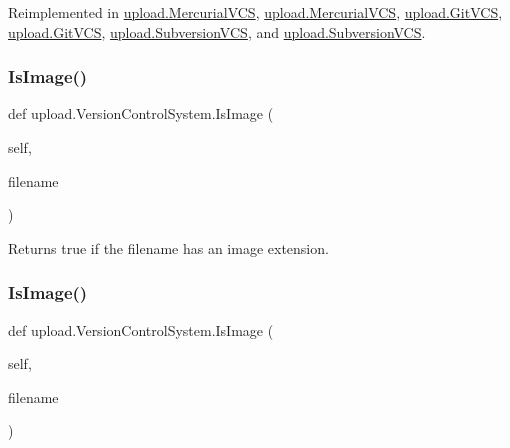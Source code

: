 Reimplemented in \mbox{\hyperlink{classupload_1_1_mercurial_v_c_s_a6190899fb86cd09ad84cc5d4b0ebd2f3}{upload.\+Mercurial\+V\+CS}}, \mbox{\hyperlink{classupload_1_1_mercurial_v_c_s_a6190899fb86cd09ad84cc5d4b0ebd2f3}{upload.\+Mercurial\+V\+CS}}, \mbox{\hyperlink{classupload_1_1_git_v_c_s_ae4e8c0e9fa01619c6a5c76d1ab84b995}{upload.\+Git\+V\+CS}}, \mbox{\hyperlink{classupload_1_1_git_v_c_s_ae4e8c0e9fa01619c6a5c76d1ab84b995}{upload.\+Git\+V\+CS}}, \mbox{\hyperlink{classupload_1_1_subversion_v_c_s_a494ba1010992d83cac015bc396ab693a}{upload.\+Subversion\+V\+CS}}, and \mbox{\hyperlink{classupload_1_1_subversion_v_c_s_a494ba1010992d83cac015bc396ab693a}{upload.\+Subversion\+V\+CS}}.

\mbox{\label{classupload_1_1_version_control_system_a846889ecd2ef40870b456ddb5b349e02}} 
\subsubsection{\texorpdfstring{IsImage()}{IsImage()}\hspace{0.1cm}{\footnotesize\ttfamily [1/2]}}
{\footnotesize\ttfamily def upload.\+Version\+Control\+System.\+Is\+Image (\begin{DoxyParamCaption}\item[{}]{self,  }\item[{}]{filename }\end{DoxyParamCaption})}

\begin{DoxyVerb}Returns true if the filename has an image extension.\end{DoxyVerb}
 \mbox{\label{classupload_1_1_version_control_system_a846889ecd2ef40870b456ddb5b349e02}} 
\subsubsection{\texorpdfstring{IsImage()}{IsImage()}\hspace{0.1cm}{\footnotesize\ttfamily [2/2]}}
{\footnotesize\ttfamily def upload.\+Version\+Control\+System.\+Is\+Image (\begin{DoxyParamCaption}\item[{}]{self,  }\item[{}]{filename }\end{DoxyParamCaption})}

